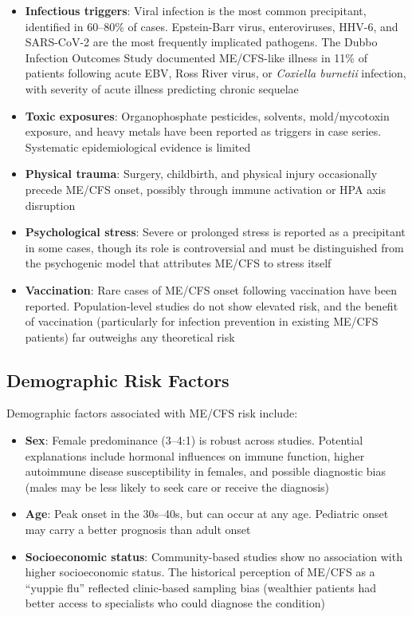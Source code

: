 \begin{itemize}
    \item \textbf{Infectious triggers}: Viral infection is the most common precipitant, identified in 60--80\% of cases. Epstein-Barr virus, enteroviruses, HHV-6, and SARS-CoV-2 are the most frequently implicated pathogens. The Dubbo Infection Outcomes Study documented ME/CFS-like illness in 11\% of patients following acute EBV, Ross River virus, or \textit{Coxiella burnetii} infection, with severity of acute illness predicting chronic sequelae
    \item \textbf{Toxic exposures}: Organophosphate pesticides, solvents, mold/mycotoxin exposure, and heavy metals have been reported as triggers in case series. Systematic epidemiological evidence is limited
    \item \textbf{Physical trauma}: Surgery, childbirth, and physical injury occasionally precede ME/CFS onset, possibly through immune activation or HPA axis disruption
    \item \textbf{Psychological stress}: Severe or prolonged stress is reported as a precipitant in some cases, though its role is controversial and must be distinguished from the psychogenic model that attributes ME/CFS to stress itself
    \item \textbf{Vaccination}: Rare cases of ME/CFS onset following vaccination have been reported. Population-level studies do not show elevated risk, and the benefit of vaccination (particularly for infection prevention in existing ME/CFS patients) far outweighs any theoretical risk
\end{itemize}

\subsection{Demographic Risk Factors}

Demographic factors associated with ME/CFS risk include:

\begin{itemize}
    \item \textbf{Sex}: Female predominance (3--4:1) is robust across studies. Potential explanations include hormonal influences on immune function, higher autoimmune disease susceptibility in females, and possible diagnostic bias (males may be less likely to seek care or receive the diagnosis)
    \item \textbf{Age}: Peak onset in the 30s--40s, but can occur at any age. Pediatric onset may carry a better prognosis than adult onset~\cite{Rowe2019pediatric}
    \item \textbf{Socioeconomic status}: Community-based studies show no association with higher socioeconomic status. The historical perception of ME/CFS as a ``yuppie flu'' reflected clinic-based sampling bias (wealthier patients had better access to specialists who could diagnose the condition)
\end{itemize}

